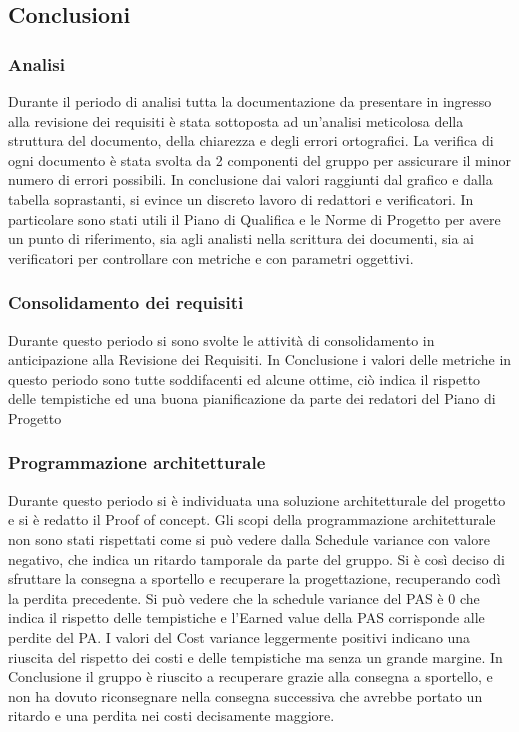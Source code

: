 \subsection{Conclusioni}

\subsubsection{Analisi}
Durante il periodo di analisi tutta la documentazione da presentare in ingresso alla revisione dei requisiti è stata sottoposta ad un'analisi meticolosa della struttura del documento, della chiarezza e degli errori ortografici. La verifica di ogni documento è stata svolta da 2 componenti del gruppo per assicurare il minor numero di errori possibili.
\newline
In conclusione dai valori raggiunti dal grafico e dalla tabella soprastanti, si evince un discreto lavoro di redattori e verificatori. In particolare sono stati utili il Piano di Qualifica e le Norme di Progetto per avere un punto di riferimento, sia agli analisti nella scrittura dei documenti, sia ai verificatori per controllare con metriche e con parametri oggettivi.

\subsubsection{Consolidamento dei requisiti}
Durante questo periodo si sono svolte le attività di consolidamento in anticipazione alla Revisione dei Requisiti.
In Conclusione i valori delle metriche in questo periodo sono tutte soddifacenti ed alcune ottime, ciò indica il rispetto delle tempistiche ed una buona pianificazione da parte dei redatori del Piano di Progetto

\subsubsection{Programmazione architetturale}
Durante questo periodo si è individuata una soluzione architetturale del progetto e si è redatto il Proof of concept.
Gli scopi della programmazione architetturale non sono stati rispettati come si può vedere dalla Schedule variance con valore negativo, che indica un ritardo tamporale da parte del gruppo.
Si è così deciso di sfruttare la consegna a sportello e recuperare la progettazione, recuperando codì la perdita precedente. Si può vedere che la schedule variance del PAS è 0 che indica il rispetto delle tempistiche e l'Earned value della PAS corrisponde alle perdite del PA.
I valori del Cost variance leggermente positivi indicano una riuscita del rispetto dei costi e delle tempistiche ma senza un grande margine.
In Conclusione il gruppo è riuscito a recuperare grazie alla consegna a sportello, e non ha dovuto riconsegnare nella consegna successiva che avrebbe portato un ritardo e una perdita nei costi decisamente maggiore.